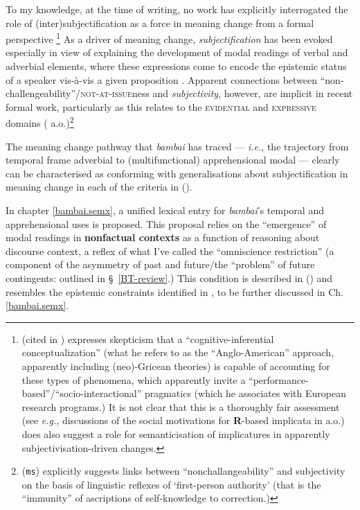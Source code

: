 \noindent To my knowledge, at the time of writing, no work has explicitly interrogated the role of (inter)subjectification as a force in meaning change from a formal perspective \citetext{\citeauthor{Eckardt2006} acknowledges this in her \citeyear{Eckardt2006} monograph (239).}\footnote{\citet{Jucker2012} (cited in \citealt[562]{Traugott2012}) expresses skepticism that a ``cognitive-inferential conceptualization'' (what he refers to as the ``Anglo-American'' approach, apparently including (neo)-Gricean theories) is capable of accounting for these types of phenomena, which apparently invite a ``performance-based''/``socio-interactional'' pragmatics (which he associates with European research programs.) It is not clear that this is a thoroughly fair assessment (see \textit{e.g.}, discussions of the social motivations for \textbf{R}-based implicata in \citealp{Horn1984,Horn1984a,Horn1993,Horn2007a} a.o.) \citet[43]{Eckardt2006} does also suggest a role for semanticisation of implicatures in apparently subjectivisation-driven changes.} As a driver of meaning change, \textit{subjectification} has been evoked especially in view of explaining the development of modal readings of verbal and adverbial elements, where these expressions come to encode the epistemic status of a speaker vis-à-vis a given proposition \citep{Finegan1995,Traugott1989,Traugott1995,Traugott2006,Traugott2003}. Apparent connections between ``non-challengeability''/\textsc{not-at-issue}ness and \textit{subjectivity}, however, are implicit in recent formal work, particularly as this relates to the \textsc{evidential} and \textsc{expressive} domains (\citealp[\textit{e.g.},][]{Korotkova2016,Faller2002,Murray2014,Korotkova2020} a.o.)\footnote{\citeauthor{Korotkova-ms} (\texttt{ms}) explicitly suggests links between ``nonchallangeability'' and subjectivity on the basis of linguistic reflexes of `first-person authority' (that is the ``immunity'' of ascriptions of self-knowledge to correction.)}


 The meaning change pathway that \textit{bambai} has traced --- \textit{i.e.}, the trajectory from temporal frame adverbial to (multifunctional) apprehensional modal --- clearly can be characterised as conforming with generalisations about subjectification in meaning change in each of the criteria in ().

  In chapter \ref{bambai.semx}, a unified lexical entry for \textit{bambai}'s temporal and apprehensional uses is proposed. This proposal relies on the ``emergence'' of modal readings in \textbf{nonfactual contexts} as a function of reasoning about discourse context, a reflex of what I've called the ``omniscience restriction'' (a component of the asymmetry of past and future/the ``problem'' of future contingents: outlined in \S~\ref{BT-review}.) This condition is described in  () and resembles the epistemic constraints identified in \citet{Kaufmann2002}, to be further discussed in Ch. \ref{bambai.semx}.
  
